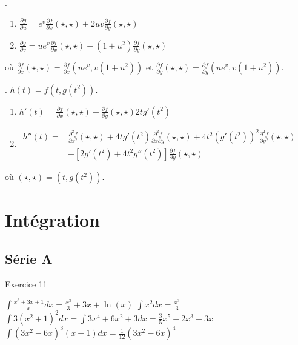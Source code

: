 .
\begin{enumerate}
    \item $\frac{ \partial g }{ \partial u } = e^v\frac{ \partial f }{ \partial x }(\star,\star)+2uv\frac{ \partial f }{ \partial y }(\star,\star)$
    \item $\frac{ \partial g }{ \partial v } = ue^v\frac{ \partial f }{ \partial x }(\star,\star)+(1+u^2)\frac{ \partial f }{ \partial y }(\star,\star)$
\end{enumerate}
o\`{u} $\frac{ \partial f }{ \partial x }(\star,\star) = \frac{ \partial f }{ \partial x }(ue^v,v(1+u^2))$ et $\frac{ \partial f }{ \partial y }(\star,\star) = \frac{ \partial f }{ \partial y }(ue^v,v(1+u^2))$.

. $h(t)=f(t,g(t^2))$.\\

\begin{enumerate}
    \item $h'(t)=\frac{ \partial f }{ \partial x }(\star,\star)+\frac{ \partial f }{ \partial y }(\star,\star)2tg'(t^2)$
    \item $ \begin{array}{rl} h''(t)=     &   \frac{ \partial^2f }{ \partial x^2 }(\star,\star)+4tg'(t^2)\frac{ \partial^2f }{ \partial x\partial y }(\star,\star)+4t^2(g'(t^2))^2\frac{ \partial^2f }{ \partial y^2 }(\star,\star) \\           
        & +[2g'(t^2)+4t^2g''(t^2)]\frac{ \partial f }{ \partial y }(\star,\star)\end{array}$

\end{enumerate}
où $(\star,\star) = (t,g(t^2))$.




 \section{Intégration}
 \subsection{Série A}
 Exercice 11
 \begin{enumerate}
   \exr $\int \frac{x^3+3x+1}{x} d x = \frac{x^3}3 + 3x + \ln(x)$%
   \exr $\int x^2d x = \frac{x^3}3$%
   \exr $\int 3(x^2+1)^2 d x = \int 3 x^4 + 6 x^2 + 3 d x = \frac 35
   x^5 + 2 x^3 + 3x$%
   \exr $\int (3x^2 - 6x)^3 (x-1) d x = \frac1{12} (3x^2 - 6x)^4$
 \end{enumerate}


